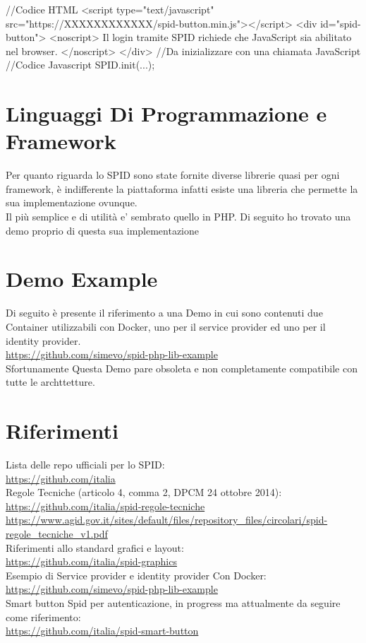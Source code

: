 //Codice HTML
<script type="text/javascript" src="https://XXXXXXXXXXXX/spid-button.min.js"></script>
<div id="spid-button">
    <noscript>
        Il login tramite SPID richiede che JavaScript sia abilitato nel browser.
    </noscript>
</div>
//Da inizializzare con una chiamata JavaScript
//Codice Javascript
SPID.init({...});

\section{Linguaggi Di Programmazione e Framework}
Per quanto riguarda lo SPID sono state fornite diverse librerie quasi
per ogni framework, è indifferente la piattaforma infatti esiste una libreria
che permette la sua implementazione ovunque.
\\ Il più semplice e di utilità e' sembrato quello in PHP.
Di seguito ho trovato una demo proprio di questa sua implementazione

\section{Demo Example}
Di seguito è presente il riferimento a una Demo in cui
sono contenuti due Container utilizzabili con Docker, uno per il service provider
ed uno per il identity provider.
\\ \url{https://github.com/simevo/spid-php-lib-example}
\\ Sfortunamente Questa Demo pare obsoleta e non completamente compatibile con tutte le archttetture.


\section{Riferimenti}
Lista delle repo ufficiali per lo SPID:
\\ \url{https://github.com/italia}
\\ Regole Tecniche (articolo 4, comma 2, DPCM 24 ottobre 2014):
\\ \url{https://github.com/italia/spid-regole-tecniche}
\\ \url{https://www.agid.gov.it/sites/default/files/repository_files/circolari/spid-regole_tecniche_v1.pdf}
\\ Riferimenti allo standard grafici e layout:
\\ \url{https://github.com/italia/spid-graphics}
\\ Esempio di Service provider e identity provider Con Docker:
\\ \url{https://github.com/simevo/spid-php-lib-example}
\\ Smart button Spid per autenticazione, in progress ma attualmente da seguire come riferimento:
\\ \url{https://github.com/italia/spid-smart-button}



